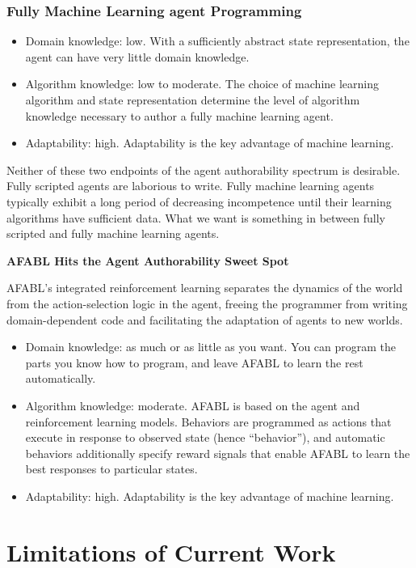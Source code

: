 \subsubsection{Fully Machine Learning agent Programming}

\begin{itemize}
\item Domain knowledge: low. With a sufficiently abstract state representation, the agent can have very little domain knowledge.
\item Algorithm knowledge: low to moderate.  The choice of machine learning algorithm and state representation determine the level of algorithm knowledge necessary to author a fully machine learning agent.
\item Adaptability: high.  Adaptability is the key advantage of machine learning.
\end{itemize}

Neither of these two endpoints of the agent authorability spectrum is desirable.  Fully scripted agents are laborious to write.  Fully machine learning agents typically exhibit a long period of decreasing incompetence until their learning algorithms have sufficient data.  What we want is something in between fully scripted and fully machine learning agents.


{\bf AFABL Hits the Agent Authorability Sweet Spot}

AFABL's integrated reinforcement learning separates the dynamics of the world from the action-selection logic in the agent, freeing the programmer from writing domain-dependent code and facilitating the adaptation of agents to new worlds.

\begin{itemize}
\item Domain knowledge: as much or as little as you want.  You can program the parts you know how to program, and leave AFABL to learn the rest automatically.
\item Algorithm knowledge: moderate.  AFABL is based on the agent and reinforcement learning models.  Behaviors are programmed as actions that execute in response to observed state (hence ``behavior''), and automatic behaviors additionally specify reward signals that enable AFABL to learn the best responses to particular states.
\item Adaptability: high. Adaptability is the key advantage of machine learning.
\end{itemize}


\section{Limitations of Current Work}

